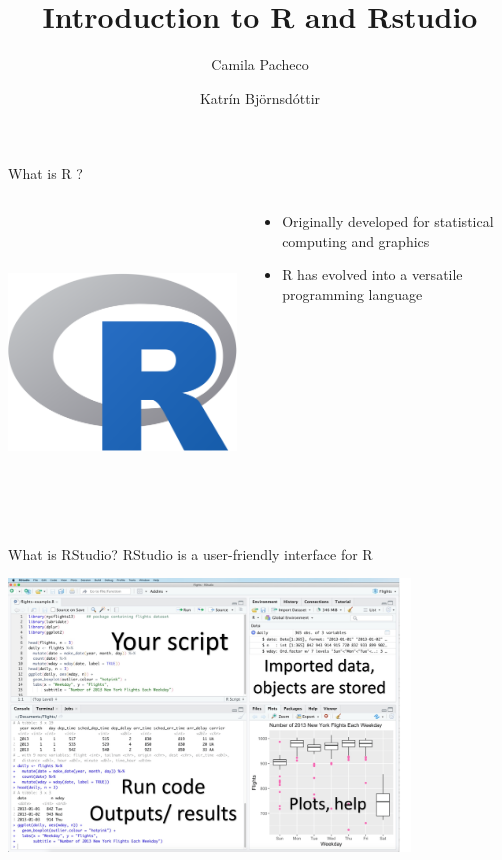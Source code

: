 \documentclass[
  ignorenonframetext,
  aspectratio=169,
]{beamer}
\title{Introduction to R and Rstudio}
\author{Camila Pacheco \and Katrín Björnsdóttir}
\date{}
\providecommand{\tightlist}{%
  \setlength{\itemsep}{0pt}\setlength{\parskip}{0pt}}\usepackage{longtable,booktabs,array}
\begin{document}
\frame{\titlepage}

\begin{frame}{What is R ?}
\label{what-is-r}
\begin{columns}[T]
\begin{column}{0.4\textwidth}
\includegraphics[width=3.64583in,height=3.125in]{Intro_R_files/mediabag/1086px-R_logo.svg.png}
\end{column}

\begin{column}{0.6\textwidth}
\begin{itemize}
\tightlist
\item
  Originally developed for statistical computing and graphics
\item
  R has evolved into a versatile programming language
\end{itemize}
\end{column}
\end{columns}
\end{frame}

\begin{frame}{What is RStudio?}
\label{what-is-rstudio}
RStudio is a user-friendly interface for R

\includegraphics[width=0.8\textwidth,height=\textheight]{sources/RStudio_IDE_screenshot.png}
\end{frame}
\end{document}
